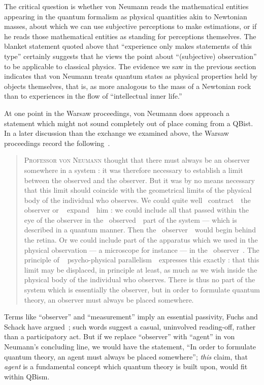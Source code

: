 \documentclass[aps,pra,superscriptaddress,12pt,tightenlines,nofootinbib]{revtex4-2}
\newcommand{\ogm}{\guillemotleft~}
\newcommand{\cgm}{~\guillemotright}
\begin{document}
The critical question is whether von Neumann reads the mathematical
entities appearing in the quantum formalism as physical quantities
akin to Newtonian masses, about which we can use subjective
perceptions to make estimations, or if he reads those mathematical
entities as standing for perceptions themselves.  The blanket
statement quoted above that ``experience only makes statements of this
type'' certainly suggests that he views the point about ``(subjective)
observation'' to be applicable to classical physics.  The evidence we
saw in the previous section indicates that von Neumann treats quantum
states as physical properties held by objects themselves, that is, as
more analogous to the mass of a Newtonian rock than to experiences in
the flow of ``intellectual inner life.''

At one point in the Warsaw proceedings, von Neumann does approach a
statement which might not sound completely out of place coming from a
QBist.  In a later discussion than the exchange we examined above, the
Warsaw proceedings record the following~\cite[p.\ 44]{VN-WARSAW}.
\begin{quotation}
\textsc{Professor von Neumann} thought that there must always be an
observer somewhere in a system : it was therefore necessary to
establish a limit between the observed and the observer.  But it was
by no means necessary that this limit should coincide with the
geometrical limits of the physical body of the individual who
observes.  We could quite well \ogm contract\cgm\ the observer or \ogm
expand\cgm\ him : we could include all that passed within the eye of
the observer in the \ogm observed\cgm\ part of the system --- which is
described in a quantum manner.  Then the \ogm observer\cgm\ would
begin behind the retina.  Or we could include part of the apparatus
which we used in the physical observation --- a microscope for
instance --- in the \ogm observer\cgm.  The principle of \ogm
psycho-physical parallelism\cgm\ expresses this exactly : that this
limit may be displaced, in principle at least, as much as we wish
inside the physical body of the individual who observes.  There is
thus no part of the system which is essentially the observer, but in
order to formulate quantum theory, an observer must always be placed
somewhere.
\end{quotation}

Terms like ``observer'' and ``measurement'' imply an essential
passivity, Fuchs and Schack have argued~\cite{RMP}; such words suggest
a casual, uninvolved reading-off, rather than a participatory act.
But if we replace ``observer'' with ``agent'' in von Neumann's
concluding line, we would have the statement, ``In order to formulate
quantum theory, an agent must always be placed somewhere'';
\emph{this} claim, that \emph{agent} is a fundamental concept which
quantum theory is built upon, would fit within QBism.
\end{document}
